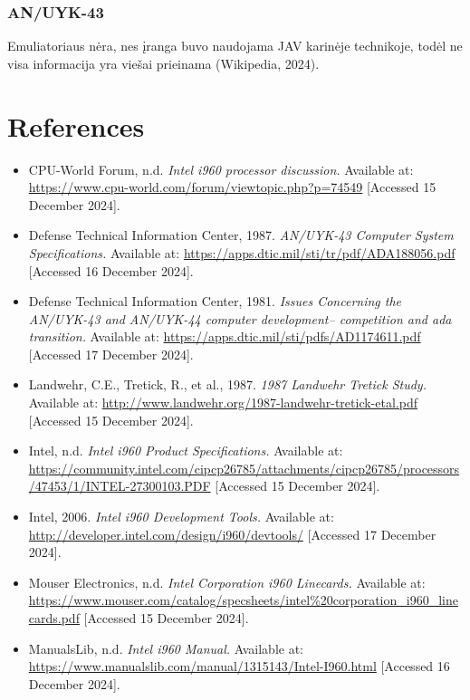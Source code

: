 \documentclass{article}
\begin{document}
\subsubsection{AN/UYK-43}
Emuliatoriaus nėra, nes įranga buvo naudojama JAV karinėje technikoje, todėl ne visa informacija yra viešai prieinama (Wikipedia, 2024).
\section{References}
\begin{itemize}
\item CPU-World Forum, n.d. \textit{Intel i960 processor discussion.} Available at: \url{https://www.cpu-world.com/forum/viewtopic.php?p=74549} [Accessed 15 December 2024].
\item Defense Technical Information Center, 1987. \textit{AN/UYK-43 Computer System Specifications.} Available at: \url{https://apps.dtic.mil/sti/tr/pdf/ADA188056.pdf} [Accessed 16 December 2024].
\item Defense Technical Information Center, 1981. \textit{Issues Concerning the AN/UYK-43 and AN/UYK-44 computer development--
competition and ada transition.} Available at: \url{https://apps.dtic.mil/sti/pdfs/AD1174611.pdf} [Accessed 17 December 2024].
\item Landwehr, C.E., Tretick, R., et al., 1987. \textit{1987 Landwehr Tretick Study.} Available at: \url{http://www.landwehr.org/1987-landwehr-tretick-etal.pdf} [Accessed 15 December 2024].

\item Intel, n.d. \textit{Intel i960 Product Specifications.} Available at: \url{https://community.intel.com/cipcp26785/attachments/cipcp26785/processors/47453/1/INTEL-27300103.PDF} [Accessed 15 December 2024].

\item Intel, 2006. \textit{Intel i960 Development Tools.} Available at: \url{http://developer.intel.com/design/i960/devtools/} [Accessed 17 December 2024].


\item Mouser Electronics, n.d. \textit{Intel Corporation i960 Linecards.} Available at: \url{https://www.mouser.com/catalog/specsheets/intel%20corporation_i960_linecards.pdf} [Accessed 15 December 2024].

\item ManualsLib, n.d. \textit{Intel i960 Manual.} Available at: \url{https://www.manualslib.com/manual/1315143/Intel-I960.html} [Accessed 16 December 2024].


\end{itemize}
\end{document}
